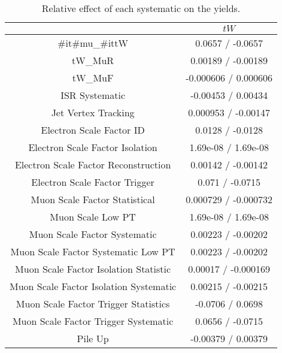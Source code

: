 \documentclass[10pt]{article}
\begin{document}
\begin{table}[htbp]
\begin{center}
\begin{tabular}{|c|c|}
\hline 
      & $tW$ \\ 
\hline 
  #it{#mu}_{#it{tW}} & 0.0657 / -0.0657 \\ 
  tW_MuR & 0.00189 / -0.00189 \\ 
  tW_MuF & -0.000606 / 0.000606 \\ 
  ISR Systematic & -0.00453 / 0.00434 \\ 
  Jet Vertex Tracking & 0.000953 / -0.00147 \\ 
  Electron Scale Factor ID & 0.0128 / -0.0128 \\ 
  Electron Scale Factor Isolation & 1.69e-08 / 1.69e-08 \\ 
  Electron Scale Factor Reconstruction & 0.00142 / -0.00142 \\ 
  Electron Scale Factor Trigger & 0.071 / -0.0715 \\ 
  Muon Scale Factor Statistical & 0.000729 / -0.000732 \\ 
  Muon Scale Low PT & 1.69e-08 / 1.69e-08 \\ 
  Muon Scale Factor Systematic & 0.00223 / -0.00202 \\ 
  Muon Scale Factor Systematic Low PT & 0.00223 / -0.00202 \\ 
  Muon Scale Factor Isolation Statistic & 0.00017 / -0.000169 \\ 
  Muon Scale Factor Isolation Systematic & 0.00215 / -0.00215 \\ 
  Muon Scale Factor Trigger Statistics & -0.0706 / 0.0698 \\ 
  Muon Scale Factor Trigger Systematic & 0.0656 / -0.0715 \\ 
  Pile Up & -0.00379 / 0.00379 \\ 
\hline 
\end{tabular} 
\caption{Relative effect of each systematic on the yields.} 
\end{center} 
\end{table} 
\end{document}

